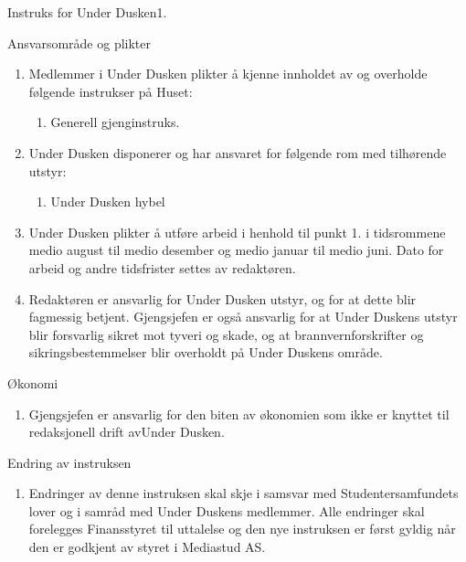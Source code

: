 \begin{instruks}{Instruks for Under Dusken}{1. }{ }
    \begin{instruksledd}{Ansvarsområde og plikter}
        \begin{enumerate}   
            \item  Medlemmer i Under Dusken plikter å kjenne innholdet av og overholde følgende
                instrukser på Huset:
                \begin{enumerate}
                    \item Generell gjenginstruks.
                \end{enumerate}
            \item Under Dusken disponerer og har ansvaret for følgende rom med tilhørende utstyr:
                \begin{enumerate}
                    \item Under Dusken hybel
                \end{enumerate}
            \item Under Dusken plikter å utføre arbeid i henhold til punkt 1. i tidsrommene
                medio august til medio desember og medio januar til medio juni. Dato for arbeid og andre tidsfrister
                settes av redaktøren.
            \item Redaktøren er ansvarlig for Under Dusken utstyr, og for at dette blir fagmessig
                betjent. Gjengsjefen er også ansvarlig for at Under Duskens utstyr blir forsvarlig sikret mot tyveri
                og skade, og at brannvernforskrifter og sikringsbestemmelser blir overholdt på Under Duskens område.
        \end{enumerate}
    \end{instruksledd}

    \begin{instruksledd}{Økonomi}
        \begin{enumerate}
            \item Gjengsjefen er ansvarlig for den biten av økonomien som ikke er knyttet til
                redaksjonell drift avUnder Dusken.
        \end{enumerate}
    \end{instruksledd}

    \begin{instruksledd}{Endring av instruksen}
        \begin{enumerate}
            \item Endringer av denne instruksen skal skje i samsvar med Studentersamfundets
                lover og i samråd med Under Duskens medlemmer. Alle endringer skal forelegges Finansstyret til
                uttalelse og den nye instruksen er først gyldig når den er godkjent av styret i Mediastud AS.
        \end{enumerate}
    \end{instruksledd}


\end{instruks}
